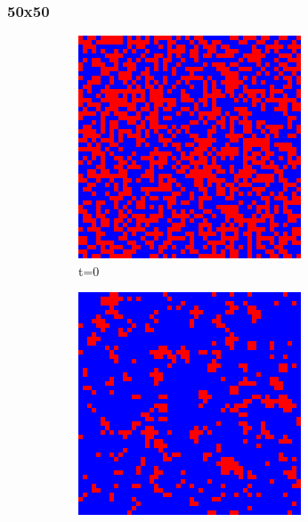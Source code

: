 \documentclass[a4paper, 11pt]{article}
\begin{document}
\subsubsection{50x50}
\begin{figure}[H]
\centering
\begin{subfigure}{.25\textwidth}
  \centering
  \includegraphics[width=0.9\linewidth]{PRISONERS_DILEMMA_VON_NEUMANN_50x50_t00}
  \caption{t=0}
\end{subfigure}%
\begin{subfigure}{.25\textwidth}
  \centering
  \includegraphics[width=0.9\linewidth]{PRISONERS_DILEMMA_VON_NEUMANN_50x50_t01}

\end{subfigure}
\end{figure}
\end{document}
